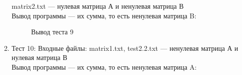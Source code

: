 \documentclass[12pt, a4paper]{article}
\begin{document}
\begin{enumerate}
	matrix2.txt --- нулевая матрица А и ненулевая матрица 
	В\\
	Вывод программы --- их сумма, то есть ненулевая матрица B:
	\begin{figure}[h]
  		\caption{Вывод теста 9}
	\end{figure}
	\newpage
	\item Тест 10: Входные файлы: matrix1.txt, 
	test2.2.txt --- ненулевая матрица А и нулевая матрица 
	В\\
	Вывод программы --- их сумма, то есть ненулевая матрица A:

\end{enumerate}
\end{document}
